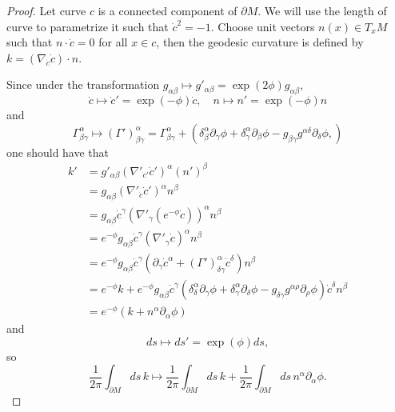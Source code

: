 \begin{proof}
Let curve $c$ is a connected component of $\partial M$.
We will use the length of curve to parametrize it such
that $\dot c^2=-1$. Choose unit vectors $n(x)\in T_{x}M$ 
such that $n\cdot \dot c=0$ for all $x\in c$, then the geodesic 
curvature is defined by $k=(\nabla_{\dot c}\dot c)\cdot n$.

Since under the transformation 
$g_{\alpha\beta}\mapsto g'_{\alpha\beta}=\exp(2\phi)g_{\alpha\beta}$, 
\[
	\dot c \mapsto \dot c'=\exp(-\phi)\dot c,\quad 
	n \mapsto n'=\exp(-\phi)n
\]
and
\[
	\Gamma^\alpha_{\beta\gamma}
	\longmapsto (\Gamma')^\alpha_{\beta\gamma}=\Gamma^\alpha_{\beta\gamma}+
	(\delta^\alpha_\beta \partial_\gamma \phi+
	\delta^\alpha_\gamma \partial_\beta \phi-
	g_{\beta\gamma}g^{\alpha\delta}\partial_\delta \phi,
	)
\]
one should have that
\begin{align*}
	k'&=g'_{\alpha\beta}(\nabla'_{\dot c'}\dot c')^\alpha
	(n')^\beta\\
	&=g_{\alpha\beta}(\nabla'_{\dot c}\dot c')^\alpha n^\beta\\
	&=g_{\alpha\beta}\dot c^\gamma 
	(\nabla'_{\gamma}(e^{-\phi}\dot c))^\alpha n^\beta\\
	&=e^{-\phi}g_{\alpha\beta}\dot c^\gamma
	(\nabla'_{\gamma}\dot c)^\alpha n^\beta\\
	&=e^{-\phi}g_{\alpha\beta}\dot c^\gamma
(\partial_\gamma\dot c^\alpha
+(\Gamma')_{\delta\gamma}^\alpha \dot c^\delta)n^\beta\\
&=e^{-\phi}k+e^{-\phi}g_{\alpha\beta}\dot c^\gamma
(\delta^\alpha_\delta \partial_\gamma \phi+
	\delta^\alpha_\gamma \partial_\delta \phi-
	g_{\delta\gamma}g^{\alpha\rho}\partial_\rho \phi)
	\dot c^\delta n^\beta\\
&=e^{-\phi}(k+n^\alpha \partial_\alpha \phi)
\end{align*}
and
\[
	ds\longmapsto ds'=\exp(\phi)ds,
\]
so
\[
	\frac{1}{2\pi}\int_{\partial M}ds\, k\longmapsto
	\frac{1}{2\pi}\int_{\partial M}ds \, k+
	\frac{1}{2\pi}\int_{\partial M}ds \, n^\alpha 
	\partial_\alpha\phi.
\]


\end{proof}
